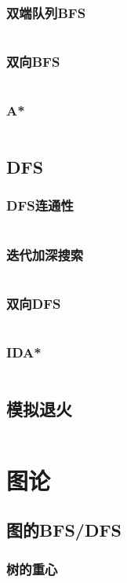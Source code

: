 \documentclass[a4paper,10pt]{article}
\begin{document}
\subsubsection{双端队列BFS}
\inputminted[breaklines, linenos]{c++}{search/bfs/deq_bfs.cc}
\subsubsection{双向BFS}
\inputminted[breaklines, linenos]{c++}{search/bfs/2side_bfs.cc}
\subsubsection{A*}
\inputminted[breaklines, linenos]{c++}{search/bfs/astar.cc}
\subsection{DFS}
\subsubsection{DFS连通性}
\inputminted[breaklines, linenos]{c++}{search/dfs/link.cc}
\subsubsection{迭代加深搜索}
\inputminted[breaklines, linenos]{c++}{search/dfs/diedai.cc}
\subsubsection{双向DFS}
\inputminted[breaklines, linenos]{c++}{search/dfs/2side.cc}
\subsubsection{IDA*}
\inputminted[breaklines, linenos]{c++}{search/dfs/ida.cc}
\subsection{模拟退火}
\inputminted[breaklines, linenos]{c++}{search/simulate_anneal.cc}

\newpage
\section{图论} %
\subsection{图的BFS/DFS}  %
\subsubsection{树的重心}
\inputminted[breaklines, linenos]{c++}{graph/bdfs/grav.cc}
\end{document}

